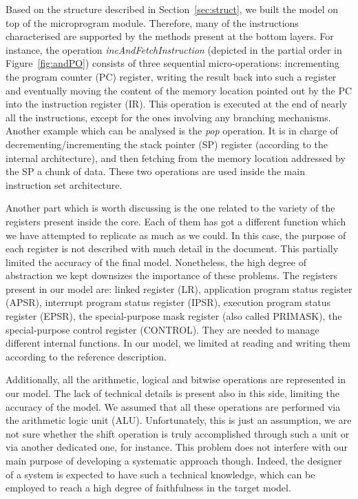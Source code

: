 \documentclass[conference]{IEEEtran}
\begin{document}
Based on the structure described in Section~\ref{sec:struct}, we built the model on top of
the microprogram module. Therefore, many of the instructions characterised are supported by
the methods present at the bottom layers. For instance, the operation
\textit{incAndFetchInstruction} (depicted in the partial order in Figure~\ref{fig:andPO})
consists of three sequential micro-operations: incrementing the program counter (PC)
register, writing the result back into such a register and eventually moving the content of
the memory location pointed out by the PC into the instruction register (IR). This operation is
executed at the end of nearly all the instructions, except for the ones involving any branching
mechanisms. Another example which can be analysed is the \textit{pop} operation. It is in charge of
decrementing/incrementing the stack pointer (SP) register (according to the internal
architecture), and then fetching from the memory location addressed by the SP a chunk of 
data. These two operations are used inside the main instruction set architecture.

Another part which is worth discussing is the one related to the variety of the
registers present inside the core. Each of them has got a different function which we have
attempted to replicate as much as we could. In this case, the purpose of each register
is not described with much detail in the document. This partially limited the accuracy of the
final model. Nonetheless, the high degree of abstraction we kept downsizes the importance of
these problems. The registers present in our model are: linked register (LR), application
program status register (APSR), interrupt program status register (IPSR), execution program
status register (EPSR), the special-purpose mask register (also called PRIMASK), the 
special-purpose control register (CONTROL). They are needed to manage different internal
functions. In our model, we limited at reading and writing them according to the reference
description.

Additionally, all the arithmetic, logical and bitwise operations are represented in our
model. The lack of technical details is present also in this side, limiting the accuracy of
the model. We assumed that all these operations are
performed via the arithmetic logic unit (ALU). Unfortunately, this is just an
assumption, we are not sure whether the shift operation is truly accomplished
through such a unit or via another dedicated one, for instance.
This problem does not interfere with our main purpose of
developing a systematic approach though. Indeed, the designer of a system is expected to have
such a technical knowledge, which can be employed to reach a high degree of faithfulness in
the target model.
\end{document}
